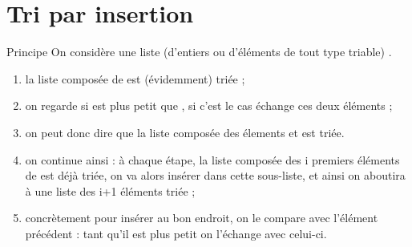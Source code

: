 \documentclass[10pt]{beamer}
\begin{document}
\section{Tri par insertion}


\begin{frame}{Principe}
On considère une liste (d'entiers ou d'éléments de tout type triable)  .

\begin{enumerate}[--]
    \item 	la liste composée de  est (évidemment) triée ;
    \item 	on regarde si  est plus petit que , si c'est le cas échange ces deux éléments ;
    \item 	on peut donc dire que la liste composée des élements  et  est triée.
    \item 	on continue ainsi : à chaque étape, la liste composée des i premiers éléments de  est déjà triée, on va alors \og insérer \fg{}  dans cette sous-liste, et ainsi on aboutira à une liste des i+1 éléments triée ;
    \item 	concrètement pour insérer  au bon endroit, on le compare avec l'élément précédent : tant qu'il est plus petit on l'échange avec celui-ci.
\end{enumerate}
\end{frame}
\end{document}
